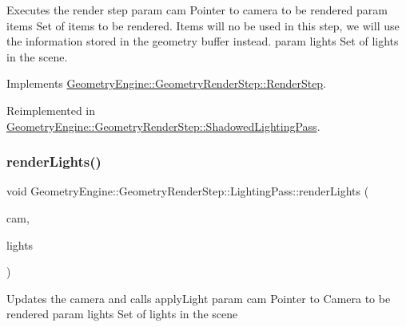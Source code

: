 Executes the render step param cam Pointer to camera to be rendered param items Set of items to be rendered. Items will no be used in this step, we will use the information stored in the geometry buffer instead. param lights Set of lights in the scene. 

Implements \mbox{\hyperlink{class_geometry_engine_1_1_geometry_render_step_1_1_render_step_a9b054ee8f38304319a9d03ba3e173dcd}{Geometry\+Engine\+::\+Geometry\+Render\+Step\+::\+Render\+Step}}.



Reimplemented in \mbox{\hyperlink{class_geometry_engine_1_1_geometry_render_step_1_1_shadowed_lighting_pass_af52807435083cd96125e6ef6d7453027}{Geometry\+Engine\+::\+Geometry\+Render\+Step\+::\+Shadowed\+Lighting\+Pass}}.

\mbox{\label{class_geometry_engine_1_1_geometry_render_step_1_1_lighting_pass_a437ff10a7ef9e7529a4852389a5cf871}} 
\subsubsection{\texorpdfstring{renderLights()}{renderLights()}}
{\footnotesize\ttfamily void Geometry\+Engine\+::\+Geometry\+Render\+Step\+::\+Lighting\+Pass\+::render\+Lights (\begin{DoxyParamCaption}\item[{\mbox{\hyperlink{class_geometry_engine_1_1_geometry_world_item_1_1_geometry_camera_1_1_camera}{Geometry\+World\+Item\+::\+Geometry\+Camera\+::\+Camera}} $\ast$}]{cam,  }\item[{std\+::unordered\+\_\+set$<$ \mbox{\hyperlink{class_geometry_engine_1_1_geometry_world_item_1_1_geometry_light_1_1_light}{Geometry\+World\+Item\+::\+Geometry\+Light\+::\+Light}} $\ast$ $>$ $\ast$}]{lights }\end{DoxyParamCaption})\hspace{0.3cm}{\ttfamily [protected]}}

Updates the camera and calls apply\+Light param cam Pointer to Camera to be rendered param lights Set of lights in the scene \mbox{\label{class_geometry_engine_1_1_geometry_render_step_1_1_lighting_pass_a42b7f335d4bebdbdd06c3bef142844c0}} 
